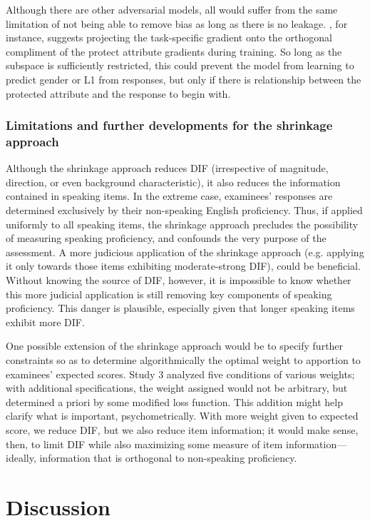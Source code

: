 \documentclass [PhD] {uclathes}
\begin{document}
Although there are other adversarial models, all would suffer from the same limitation of not being able to remove bias as long as there is no leakage. \citet{zhang2018mitigating}, for instance, suggests projecting the task-specific gradient onto the orthogonal compliment of the protect attribute gradients during training. So long as the subspace is sufficiently restricted, this could prevent the model from learning to predict gender or L1 from responses, but only if there is relationship between the protected attribute and the response to begin with. 

\subsection{Limitations and further developments for the shrinkage approach}

Although the shrinkage approach reduces DIF (irrespective of magnitude, direction, or even background characteristic), it also reduces the information contained in speaking items. In the extreme case, examinees’ responses are determined exclusively by their non-speaking English proficiency. Thus, if applied uniformly to all speaking items, the shrinkage approach precludes the possibility of measuring speaking proficiency, and confounds the very purpose of the assessment. A more judicious application of the shrinkage approach (e.g. applying it only towards those items exhibiting moderate-strong DIF), could be beneficial. Without knowing the source of DIF, however, it is impossible to know whether this more judicial application is still removing key components of speaking proficiency. This danger is plausible, especially given that longer speaking items exhibit more DIF. 

One possible extension of the shrinkage approach would be to specify further constraints so as to determine algorithmically the optimal weight to apportion to examinees’ expected scores. Study 3 analyzed five conditions of various weights; with additional specifications, the weight assigned would not be arbitrary, but determined a priori by some modified loss function. This addition might help clarify what is important, psychometrically. With more weight given to expected score, we reduce DIF, but we also reduce item information; it would make sense, then, to limit DIF while also maximizing some measure of item information—ideally, information that is orthogonal to non-speaking proficiency. 



\chapter{Discussion}
\end{document}
